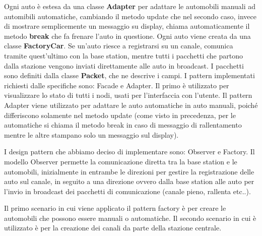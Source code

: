 \documentclass[a4paper,10pt]{article}
\begin{document}
Ogni auto è estesa da una classe \textbf{Adapter} per adattare le automobili manuali ad automibili automatiche, cambiando il metodo update che nel secondo caso, invece di mostrare semplicemente un messaggio su display, chiama automaticamente il metodo \textbf{break} che fa frenare l'auto in questione. Ogni auto viene creata da una classe \textbf{FactoryCar}. Se un'auto riesce a registrarsi su un canale, comunica tramite quest'ultimo con la base station, mentre tutti i pacchetti che partono dalla stazione vengono inviati direttamente alle auto in broadcast. I pacchetti sono definiti dalla classe \textbf{Packet}, che ne descrive i campi.
I pattern implementati richiesti dalle specifiche sono: Facade e Adapter. Il primo è utilizzato per visualizzare lo stato di tutti i nodi, usati per l'interfaccia con l'utente. Il pattern Adapter viene utilizzato per adattare le auto automatiche in auto manuali, poiché differiscono solamente nel metodo update (come visto in precedenza, per le automatiche si chiama il metodo break in caso di messaggio di rallentamento mentre le altre stampano solo un messaggio sul display). 

I design pattern che abbiamo deciso di implementare sono: Observer e Factory. Il modello Observer permette la comunicazione diretta tra la base station e le automobili, inizialmente in entrambe le direzioni per gestire la registrazione delle auto sul canale, in seguito a una direzione ovvero dalla base station alle auto per l'invio in broadcast dei pacchetti di comunicazione (canale pieno, rallenta etc..).

Il primo scenario in cui viene applicato il pattern factory è per creare le automobili che possono essere manuali o automatiche. Il secondo scenario in cui è utilizzato è per la creazione dei canali da parte della stazione centrale.
\end{document}
